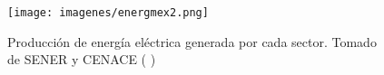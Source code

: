 \vspace{-15pt}

\begin{figure}[H]
    \centering
    \texttt{[image: imagenes/energmex2.png]}
    \caption{Producción de energía eléctrica generada por cada sector. \linebreak Tomado de SENER y CENACE ( \citeyear{prodesen})}
    \label{fig:imagenes-energmex2}
\end{figure}



